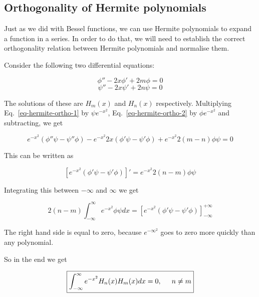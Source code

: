 \subsection{Orthogonality of Hermite polynomials}

Just as we did with Bessel functions, we can use Hermite polynomials to expand a function in a series. In order to do that, we will need to establish the correct orthogonality relation between Hermite polynomials and normalise them.

Consider the following two differential equations:

\begin{equation}
\phi'' - 2 x \phi' + 2m \phi = 0 \label{eq-hermite-ortho-1}
\end{equation}
\begin{equation}
\psi'' - 2 x \psi' + 2n \psi = 0 \label{eq-hermite-ortho-2}
\end{equation}

The solutions of these are $H_m(x)$ and $H_n(x)$ respectively. Multiplying Eq.~\ref{eq-hermite-ortho-1} by $\psi e^{-x^2}$, Eq.~\ref{eq-hermite-ortho-2} by $\phi e^{-x^2}$ and subtracting, we get

\begin{equation}
e^{-x^2}\left(\phi''\psi -\psi''\phi\right)- e^{-x^2} 2 x \left(\phi'\psi -\psi'\phi\right)+ e^{-x^2}2(m-n)\phi\psi = 0
\end{equation} 

This can be written as

\begin{equation}
\left[e^{-x^2}\left(\phi'\psi -\psi'\phi\right)\right]' = e^{-x^2}2(n-m)\phi\psi
\end{equation} 

Integrating this between $-\infty$ and $\infty$ we get

\begin{equation}
2(n-m)\int_{-\infty}^{\infty}e^{-x^2}\phi\psi dx = \left[e^{-x^2}\left(\phi'\psi -\psi'\phi\right)\right]_{-\infty}^{+\infty}
\end{equation} 

The right hand side is equal to zero, because $e^{-{\infty}^2}$ goes to zero more quickly than any polynomial.

So in the end we get

\begin{equation}
\fbox{$\displaystyle
\int_{-\infty}^{\infty}e^{-x^2}H_n(x)H_m(x)dx = 0, \hspace{0.5cm} n \ne m \label{eq-hermite-ortho}
$}
\end{equation} 

